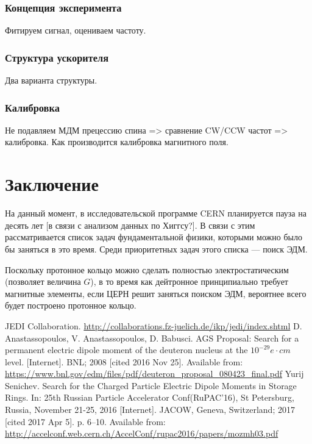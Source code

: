 \documentclass{extarticle}
\begin{document}
	\subsubsection{Концепция эксперимента}
		Фитируем сигнал, оцениваем частоту.
	\subsubsection{Структура ускорителя}
		Два варианта структуры.
	\subsubsection{Калибровка}
		Не подавляем МДМ прецессию спина => сравнение CW/CCW частот => калибровка. Как производится калибровка магнитного поля.
\section*{Заключение}
На данный момент, в исследовательской программе CERN планируется пауза на десять лет [в связи с анализом данных по Хиггсу?]. В связи с этим рассматривается список задач фундаментальной физики, которыми можно было бы заняться в это время. Среди приоритетных задач этого списка --- поиск ЭДМ. 

Поскольку протонное кольцо можно сделать полностью электростатическим (позволяет величина $G$), в то время как дейтронное принципиально требует магнитные элементы, если ЦЕРН решит заняться поиском ЭДМ, вероятнее всего будет построено протонное кольцо.
\begin{thebibliography}{0}
	JEDI Collaboration. \url{http://collaborations.fz-juelich.de/ikp/jedi/index.shtml}
	D. Anastassopoulos, V. Anastassopoulos, D. Babusci. AGS Proposal: Search for a permanent electric dipole moment of the deuteron nucleus at the $10^{-29} e\cdot cm$ level. [Internet]. BNL; 2008 [cited 2016 Nov 25]. Available from: \url{https://www.bnl.gov/edm/files/pdf/deuteron_proposal_080423_final.pdf}
	Yurij Senichev. Search for the Charged Particle Electric Dipole Moments in Storage Rings. In: 25th Russian Particle Accelerator Conf(RuPAC’16), St Petersburg, Russia, November 21-25, 2016 [Internet]. JACOW, Geneva, Switzerland; 2017 [cited 2017 Apr 5]. p. 6–10. Available from: \url{http://accelconf.web.cern.ch/AccelConf/rupac2016/papers/mozmh03.pdf}
	
\end{thebibliography}
\end{document}
